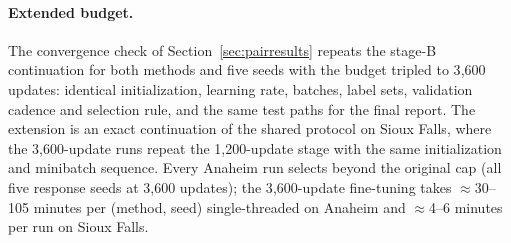 \paragraph{Extended budget.}
The convergence check of Section~\ref{sec:pairresults} repeats the
stage-B continuation for both methods and five seeds with the budget
tripled to 3{,}600 updates: identical initialization, learning rate,
batches, label sets, validation cadence and selection rule, and the
same test paths for the final report. The extension is an exact
continuation of the shared protocol on Sioux Falls, where the
3{,}600-update runs repeat the 1{,}200-update stage with the same
initialization and minibatch sequence. Every Anaheim run selects beyond
the original cap (all five response seeds at 3{,}600 updates); the
3{,}600-update fine-tuning takes $\approx$30--105 minutes per
(method, seed) single-threaded on Anaheim and $\approx$4--6 minutes
per run on Sioux Falls.
